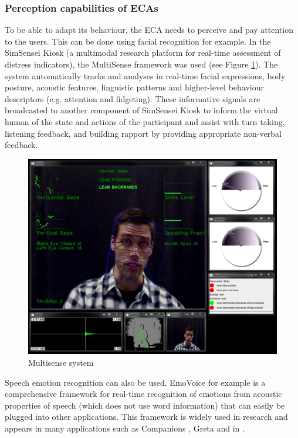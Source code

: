 \documentclass[11pt]{article}
\begin{document}
\subsubsection{Perception capabilities of ECAs}
To be able to adapt its behaviour, the ECA needs to perceive and pay attention to the users. This can be done using facial recognition for example. In the SimSensei Kiosk \citep{DeVault14} (a multimodal research platform for real-time assessment of distress indicators), the MultiSense framework was used (see Figure \ref{Figure visio}). The system automatically tracks and analyses in real-time facial expressions, body posture, acoustic features, linguistic patterns and higher-level behaviour descriptors (e.g. attention and fidgeting). These informative signals are broadcasted to another component of SimSensei Kiosk to inform the virtual human of the state and actions of the participant and assist with turn taking, listening feedback, and building rapport by providing appropriate non-verbal feedback. \\
\begin{figure}[h]
   	\centerline{\includegraphics[scale=0.28]{./images/simsensei}}
   	\caption{\label{Figure visio} Multisense system \citep{DeVault14}}
\end{figure}

Speech emotion recognition can also be used. EmoVoice \citep{Vogt08} for example is a comprehensive framework for real-time recognition of emotions from acoustic properties of speech (which does not use word information) that can easily be plugged into other applications. This framework is widely used in research and appears in many applications such as Companions \citep{Smith11}, Greta \citep{DeRosis03} and in \citep{Pizzi11}.\\
\end{document}
